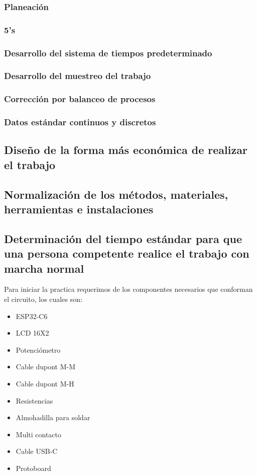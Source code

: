     \subsubsection{Planeación}
    
    \subsubsection{5's}
    
    \subsubsection{Desarrollo del sistema de tiempos predeterminado}
    \subsubsection{Desarrollo del muestreo del trabajo}
    \subsubsection{Corrección por balanceo de procesos}
    \subsubsection{Datos estándar continuos y discretos}
    
    
    \subsection{Diseño de la forma más económica de realizar el trabajo}
    
    \subsection{Normalización de los métodos, materiales, herramientas e instalaciones}
    
    \subsection{Determinación del tiempo estándar para que una persona competente realice el trabajo con marcha normal}
    
    Para iniciar la practica requerimos de los componentes necesarios que conforman el circuito, los cuales son:
    \begin{itemize}
        \item ESP32-C6
        \item LCD 16X2
        \item Potenciómetro
        \item Cable dupont M-M
        \item Cable dupont M-H
        \item Resistencias
        \item Almohadilla para soldar
        \item Multi contacto
        \item Cable USB-C
        \item Protoboard 
    \end{itemize}
    
